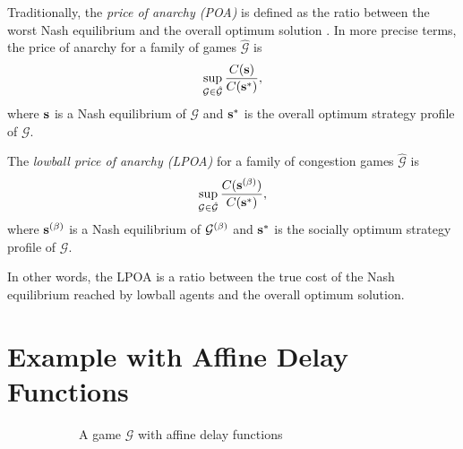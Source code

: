 \documentclass[twoside]{article}
\begin{document}
\begin{multicols}{2}
Traditionally, the \textit{price of anarchy (POA)} is defined as the ratio
between the worst Nash equilibrium and the overall optimum solution
\cite{Koutsoupias2009}.  In more precise terms, the price of anarchy for a
family of games $\hat{\mathcal{G}}$ is
\[
  \sup_{\mathcal{G} \in \hat{\mathcal{G}}} \frac{C(\s)}{C(\s^*)},
\]
where $\s$ is a Nash equilibrium of $\mathcal{G}$ and $\s^*$ is the overall
optimum strategy profile of $\mathcal{G}$.

\begin{defn}
  The \textit{lowball price of anarchy (LPOA)} for a family of congestion games
  $\hat{\mathcal{G}}$ is
  \begin{equation}
    \sup_{\mathcal{G} \in \hat{\mathcal{G}}} \frac{C(\s\pbet)}{C(\s^*)},
    \label{eq:lpoa}
  \end{equation}
  where $\s\pbet$ is a Nash equilibrium of $\mathcal{G}\pbet$ and $\s^*$ is the
  socially optimum strategy profile of $\mathcal{G}$.
\end{defn} In other words, the LPOA is a ratio between the true cost of the Nash
equilibrium reached by lowball agents and the overall optimum solution.

\section{Example with Affine Delay Functions}
\begin{figure}[H]
  \centering
  \begin{subfigure}[b]{\linewidth}
    \centering
    \caption{A game $\mathcal{G}$ with affine delay functions}
    \label{fig:affine}
  \end{subfigure}

  \begin{subfigure}[b]{\linewidth}
    \centering
    \begin{tikzpicture} [baseline=(s.base), arc/.style={->,thick,>=stealth},
      vertex/.style={draw,circle,minimum size=.5cm},scale=1.5]


\end{tikzpicture}
\end{subfigure}
\end{figure}
\end{multicols}
\end{document}
